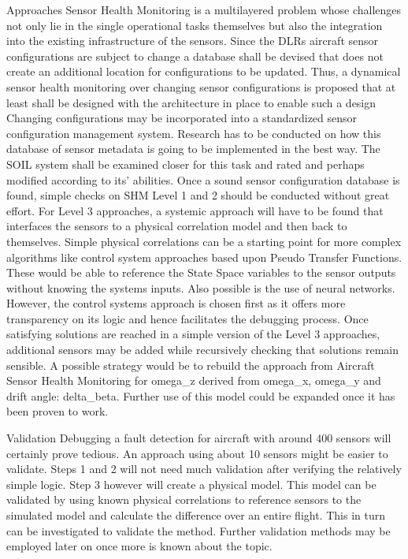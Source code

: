 Approaches
Sensor Health Monitoring is a multilayered problem whose challenges not only lie in the single operational tasks themselves but also the integration into the existing infrastructure of the sensors. Since the DLRs aircraft sensor configurations are subject to change a database shall be devised that does not create an additional location for configurations to be updated. Thus, a dynamical sensor health monitoring over changing sensor configurations is proposed that at least shall be designed with the architecture in place to enable such a design
Changing configurations may be incorporated into a standardized sensor configuration management system. Research has to be conducted on how this database of sensor metadata is going to be implemented in the best way. The SOIL system shall be examined closer for this task and rated and perhaps modified according to its’ abilities.
Once a sound sensor configuration database is found, simple checks on SHM Level 1 and 2 should be conducted without great effort. For Level 3 approaches, a systemic approach will have to be found that interfaces the sensors to a physical correlation model and then back to themselves. Simple physical correlations can be a starting point for more complex algorithms like control system approaches based upon Pseudo Transfer Functions. These would be able to reference the State Space variables to the sensor outputs without knowing the systems inputs. Also possible is the use of neural networks. However, the control systems approach is chosen first as it offers more transparency on its logic and hence facilitates the debugging process.
Once satisfying solutions are reached in a simple version of the Level 3 approaches, additional sensors may be added while recursively checking that solutions remain sensible. A possible strategy would be to rebuild the approach from Aircraft Sensor Health Monitoring for omega_z derived from omega_x, omega_y and drift angle: delta_beta. Further use of this model could be expanded once it has been proven to work.


Validation
Debugging a fault detection for aircraft with around 400 sensors will certainly prove tedious. An approach using about 10 sensors might be easier to validate. Steps 1 and 2 will not need much validation after verifying the relatively simple logic. Step 3 however will create a physical model. This model can be validated by using known physical correlations to reference sensors to the simulated model and calculate the difference over an entire flight. This in turn can be investigated to validate the method. Further validation methods may be employed later on once more is known about the topic.


